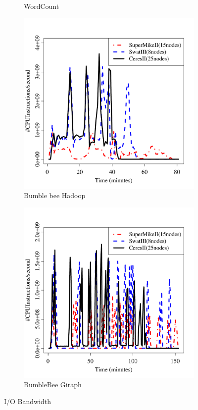 \documentclass[journal]{IEEEtran}
\begin{document}
\begin{figure}[htb]
\begin{subfigure}[b]{0.24\textwidth}
                \caption{WordCount}
                \label{fig:WordCountIO}
   \end{subfigure}
   \begin{subfigure}[b]{0.24\textwidth}
                \includegraphics[width=\textwidth]{Figures/SystemFigures/BombusGrConsIO.pdf}
                \caption{Bumble bee Hadoop}
                \label{fig:BombusGrConsIO}
    \end{subfigure}
 	\begin{subfigure}[b]{0.24\textwidth}
                \includegraphics[width=\textwidth]{Figures/SystemFigures/BombusGrSimpIO.pdf}
                \caption{BumbleBee Giraph}
                \label{fig:BombusGrSimpIO}
   \end{subfigure}
   \caption{I/O Bandwidth}
  \label{fig:IO}
\end{figure}
\end{document}
